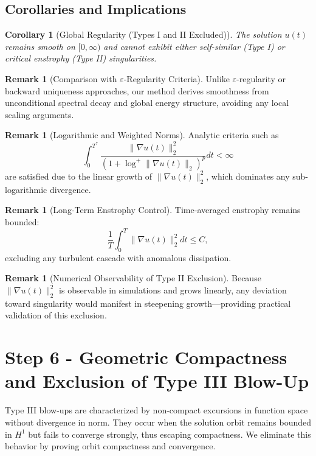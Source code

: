\documentclass[11pt]{article}
\newtheorem{corollary}[theorem]{Corollary}
\theoremstyle{definition}
\newtheorem{remark}[theorem]{Remark}
\begin{document}
\subsection*{Corollaries and Implications}
\begin{corollary}[Global Regularity (Types I and II Excluded)]
The solution $u(t)$ remains smooth on $[0, \infty)$ and cannot exhibit either self-similar (Type I) or critical enstrophy (Type II) singularities.
\end{corollary}

\begin{remark}[Comparison with $\varepsilon$-Regularity Criteria]
Unlike $\varepsilon$-regularity or backward uniqueness approaches, our method derives smoothness from unconditional spectral decay and global energy structure, avoiding any local scaling arguments.
\end{remark}

\begin{remark}[Logarithmic and Weighted Norms]
Analytic criteria such as
\[
\int_0^{T^*} \frac{\|\nabla u(t)\|_2^2}{(1 + \log^+ \|\nabla u(t)\|_2)^p} dt < \infty
\]
are satisfied due to the linear growth of $\|\nabla u(t)\|_2^2$, which dominates any sub-logarithmic divergence.
\end{remark}

\begin{remark}[Long-Term Enstrophy Control]
Time-averaged enstrophy remains bounded:
\[
\frac{1}{T} \int_0^T \|\nabla u(t)\|_2^2 dt \le C,
\]
excluding any turbulent cascade with anomalous dissipation.
\end{remark}

\begin{remark}[Numerical Observability of Type II Exclusion]
Because $\|\nabla u(t)\|_2^2$ is observable in simulations and grows linearly, any deviation toward singularity would manifest in steepening growth—providing practical validation of this exclusion.
\end{remark}



\section{Step 6 - Geometric Compactness and Exclusion of Type III Blow-Up}
\label{sec:step6}

Type III blow-ups are characterized by non-compact excursions in function space without divergence in norm. They occur when the solution orbit remains bounded in $H^1$ but fails to converge strongly, thus escaping compactness. We eliminate this behavior by proving orbit compactness and convergence.
\end{document}
